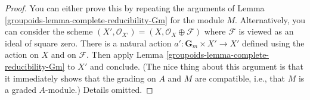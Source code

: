 \begin{proof}

You can either prove this by repeating the arguments of
Lemma \ref{groupoids-lemma-complete-reducibility-Gm} for the module $M$.
Alternatively, you can consider the scheme
$(X', \mathcal{O}_{X'}) = (X, \mathcal{O}_X \oplus \mathcal{F})$
where $\mathcal{F}$ is viewed as an ideal of square zero.
There is a natural action $a' : \mathbf{G}_m \times X' \to X'$
defined using the action on $X$ and on $\mathcal{F}$. Then apply
Lemma \ref{groupoids-lemma-complete-reducibility-Gm} to $X'$ and conclude.
(The nice thing about this argument is that it immediately shows
that the grading on $A$ and $M$ are compatible, i.e., that $M$
is a graded $A$-module.)
Details omitted.
\end{proof}

